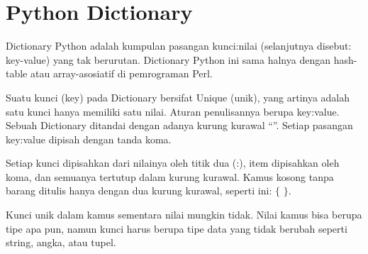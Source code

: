 \section{Python Dictionary} \par 
Dictionary Python adalah kumpulan pasangan kunci:nilai (selanjutnya disebut: key-value) yang tak berurutan. Dictionary Python ini sama halnya dengan hash-table atau array-asosiatif di pemrograman Perl. \par

Suatu kunci (key) pada Dictionary bersifat Unique (unik), yang artinya adalah satu kunci hanya memiliki satu nilai. Aturan penulisannya berupa key:value. Sebuah Dictionary ditandai dengan adanya kurung kurawal “{}”. Setiap pasangan key:value dipisah dengan tanda koma. \par

Setiap kunci dipisahkan dari nilainya oleh titik dua (:), item dipisahkan oleh koma, dan semuanya tertutup dalam kurung kurawal. Kamus kosong tanpa barang ditulis hanya dengan dua kurung kurawal, seperti ini:  $  \{  $ $  \}  $. \par

Kunci unik dalam kamus sementara nilai mungkin tidak. Nilai kamus bisa berupa tipe apa pun, namun kunci harus berupa tipe data yang tidak berubah seperti string, angka, atau tupel. \par


